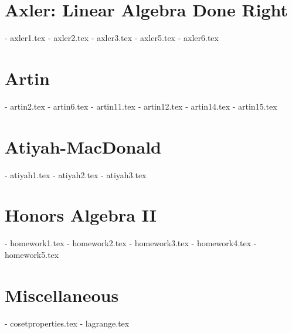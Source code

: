 \section{Axler: Linear Algebra Done Right}
- axler1.tex     %
- axler2.tex     %
- axler3.tex     %
- axler5.tex     %
- axler6.tex     %

\section{Artin}
- artin2.tex     %
- artin6.tex     %
- artin11.tex     %
- artin12.tex     %
- artin14.tex     %
- artin15.tex     %

\section{Atiyah-MacDonald}
- atiyah1.tex     %
- atiyah2.tex     %
- atiyah3.tex     %

\section{Honors Algebra II}
- homework1.tex
- homework2.tex
- homework3.tex
- homework4.tex
- homework5.tex

\section{Miscellaneous}
- cosetproperties.tex     %
- lagrange.tex     %
